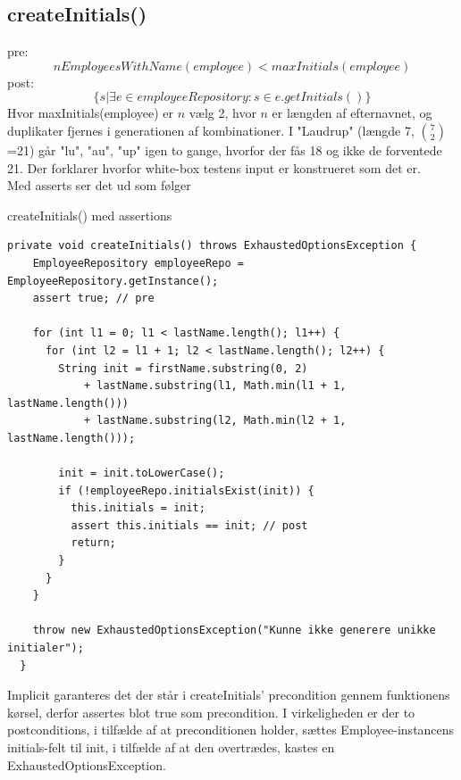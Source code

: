 \subsection{createInitials()} \label{sec:contract_create_initials}
pre:
\begin{equation}
    nEmployeesWithName(employee) < maxInitials(employee)
\end{equation}
post:
\begin{equation}
    \{s | \exists e \in employeeRepository : s \in e.getInitials()\}
\end{equation}
Hvor maxInitials(employee) er $n$ vælg 2, hvor $n$ er længden af efternavnet, og duplikater fjernes i generationen af kombinationer.
I "Laudrup" (længde 7, $7 \choose 2$=21) går "lu", "au", "up" igen to gange, hvorfor der fås 18 og ikke de forventede 21. Der forklarer hvorfor white-box testens input er konstrueret som det er.\\[4mm]
Med asserts ser det ud som følger

\begin{listing}[H]
    \centering
    \caption{createInitials() med assertions}\label{lst:create_initials_assertions}
    \begin{verbatim}
private void createInitials() throws ExhaustedOptionsException {
    EmployeeRepository employeeRepo = EmployeeRepository.getInstance();
    assert true; // pre

    for (int l1 = 0; l1 < lastName.length(); l1++) {
      for (int l2 = l1 + 1; l2 < lastName.length(); l2++) {
        String init = firstName.substring(0, 2)
            + lastName.substring(l1, Math.min(l1 + 1, lastName.length()))
            + lastName.substring(l2, Math.min(l2 + 1, lastName.length()));

        init = init.toLowerCase();
        if (!employeeRepo.initialsExist(init)) {
          this.initials = init;
          assert this.initials == init; // post
          return;
        }
      }
    }

    throw new ExhaustedOptionsException("Kunne ikke generere unikke initialer");
  }
    \end{verbatim}
\end{listing}
\noindent
Implicit garanteres det der står i createInitials' precondition gennem funktionens kørsel, derfor assertes blot true som precondition. I virkeligheden er der to postconditions, i tilfælde af at preconditionen holder, sættes Employee-instancens initials-felt til init, i tilfælde af at den overtrædes, kastes en ExhaustedOptionsException.

